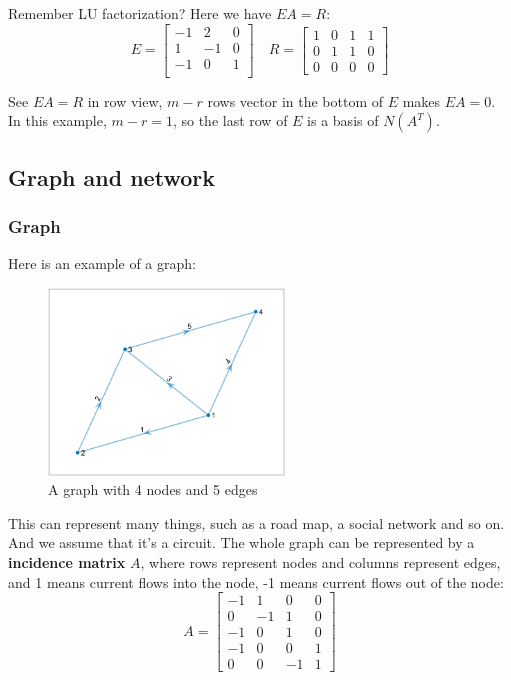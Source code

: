 \documentclass[12pt]{ctexart}
\begin{document}
Remember LU factorization? Here we have $EA = R$:
\[
  E = \begin{bmatrix}
    -1 & 2 & 0 \\
    1 & -1 & 0 \\
    -1 & 0 & 1 \\
  \end{bmatrix}
  \quad
  R = \begin{bmatrix}
    1 & 0 & 1 & 1 \\
    0 & 1 & 1 & 0 \\
    0 & 0 & 0 & 0
  \end{bmatrix}
\]

See $EA = R$ in row view, $m - r$ rows vector in the bottom of $E$ makes $EA = 0$.
In this example, $m - r = 1$, so the last row of $E$ is a basis of $N(A^{T})$.

\subsection{\textbf{Graph and network}}
\subsubsection{\textbf{Graph}}

Here is an example of a graph:
\begin{figure}[H]
  \centering
  \includegraphics[width=0.56\textwidth]{assets/2.7 Graph and network/Graph.png}
  \caption{A graph with 4 nodes and 5 edges}
\end{figure}

This can represent many things, such as a road map, a social network and so on.
And we assume that it's a circuit. The whole graph can be represented by a\textbf{
incidence matrix} $A$, where rows represent nodes and columns represent edges, and
1 means current flows into the node, -1 means current flows out of the node:
\[
  A = \begin{bmatrix}
    -1 & 1 & 0 & 0 \\
    0 & -1 & 1 & 0 \\
    -1 & 0 & 1 & 0 \\
    -1 & 0 & 0 & 1 \\
    0 & 0 & -1 & 1
  \end{bmatrix}
\]
\end{document}
